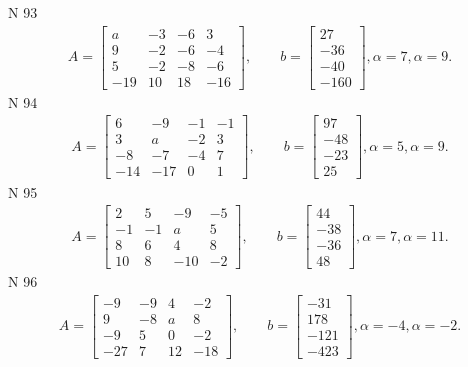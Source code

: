 \documentclass[11pt]{report}
\begin{document}
N 93
\begin{align*}
 A = \left[\begin{matrix}a & -3 & -6 & 3\\9 & -2 & -6 & -4\\5 & -2 & -8 & -6\\-19 & 10 & 18 & -16\end{matrix}\right],
    \qquad b = \left[\begin{matrix}27\\-36\\-40\\-160\end{matrix}\right], \alpha = 7, \alpha = 9. 
 \end{align*}
N 94
\begin{align*}
 A = \left[\begin{matrix}6 & -9 & -1 & -1\\3 & a & -2 & 3\\-8 & -7 & -4 & 7\\-14 & -17 & 0 & 1\end{matrix}\right],
    \qquad b = \left[\begin{matrix}97\\-48\\-23\\25\end{matrix}\right], \alpha = 5, \alpha = 9. 
 \end{align*}
N 95
\begin{align*}
 A = \left[\begin{matrix}2 & 5 & -9 & -5\\-1 & -1 & a & 5\\8 & 6 & 4 & 8\\10 & 8 & -10 & -2\end{matrix}\right],
    \qquad b = \left[\begin{matrix}44\\-38\\-36\\48\end{matrix}\right], \alpha = 7, \alpha = 11. 
 \end{align*}
N 96
\begin{align*}
 A = \left[\begin{matrix}-9 & -9 & 4 & -2\\9 & -8 & a & 8\\-9 & 5 & 0 & -2\\-27 & 7 & 12 & -18\end{matrix}\right],
    \qquad b = \left[\begin{matrix}-31\\178\\-121\\-423\end{matrix}\right], \alpha = -4, \alpha = -2. 
 \end{align*}
\end{document}
